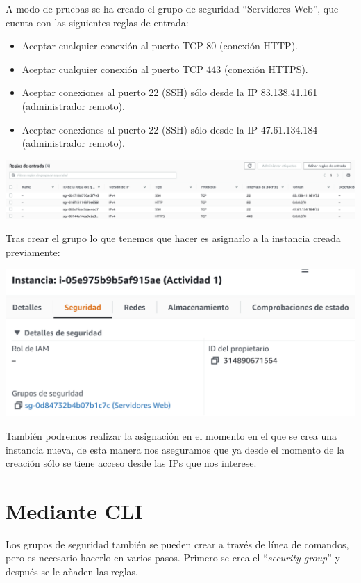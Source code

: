 \documentclass{\ClassPath/viu-tfm-template}
\begin{document}
A modo de pruebas se ha creado el grupo de seguridad “Servidores Web”, que cuenta con las siguientes reglas de entrada:
\begin{itemize}
    \item Aceptar cualquier conexión al puerto TCP 80 (conexión HTTP).
    \item Aceptar cualquier conexión al puerto TCP 443 (conexión HTTPS).
    \item Aceptar conexiones al puerto 22 (SSH) sólo desde la IP 83.138.41.161 (administrador remoto).
    \item Aceptar conexiones al puerto 22 (SSH) sólo desde la IP 47.61.134.184 (administrador remoto).
\end{itemize}

\begin{center}
    \includegraphics[frame,width=\linewidth]{img/grupos.png}
\end{center}

Tras crear el grupo lo que tenemos que hacer es asignarlo a la instancia creada previamente:

\begin{center}
    \includegraphics[frame,width=0.7\linewidth]{img/grupos2.png}
\end{center}

También podremos realizar la asignación en el momento en el que se crea una instancia nueva, de esta manera nos aseguramos que ya desde el momento de la creación sólo se tiene acceso desde las IPs que nos interese.

\section{Mediante CLI}

Los grupos de seguridad también se pueden crear a través de línea de comandos, pero es necesario hacerlo en varios pasos. Primero se crea el “\textit{security group}” y después se le añaden las reglas.
\end{document}
